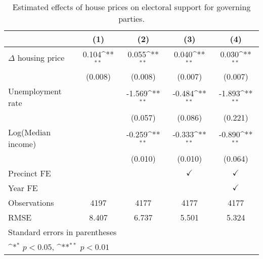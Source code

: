 \begin{table}[htbp]\centering
\def\sym#1{\ifmmode^{#1}\else\(^{#1}\)\fi}
\caption{Estimated effects of house prices on electoral support for governing parties.} \label{predv}
\begin{tabular}{l*{4}{c}}
\hline\hline
                    &\multicolumn{1}{c}{(1)}        &\multicolumn{1}{c}{(2)}        &\multicolumn{1}{c}{(3)}        &\multicolumn{1}{c}{(4)}        \\
\hline
$\Delta$ housing price&       0.104\sym{**}&       0.055\sym{**}&       0.040\sym{**}&       0.030\sym{**}\\
                    &     (0.008)        &     (0.008)        &     (0.007)        &     (0.007)        \\
[1em]
Unemployment rate   &                    &      -1.569\sym{**}&      -0.484\sym{**}&      -1.893\sym{**}\\
                    &                    &     (0.057)        &     (0.086)        &     (0.221)        \\
[1em]
Log(Median income)  &                    &      -0.259\sym{**}&      -0.333\sym{**}&      -0.890\sym{**}\\
                    &                    &     (0.010)        &     (0.010)        &     (0.064)        \\
[1em]
\hline Precinct FE  &                    &                    &$\checkmark$        &$\checkmark$        \\
[1em]
Year FE             &                    &                    &                    &$\checkmark$        \\
\hline
Observations        &        4197        &        4177        &        4177        &        4177        \\
RMSE                &       8.407        &       6.737        &       5.501        &       5.324        \\
\hline\hline
\multicolumn{5}{l}{\footnotesize Standard errors in parentheses}\\
\multicolumn{5}{l}{\footnotesize \sym{*} \(p<0.05\), \sym{**} \(p<0.01\)}\\
\end{tabular}
\end{table}
